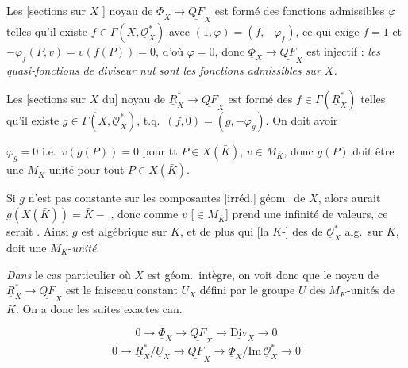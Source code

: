 \documentclass[11pt,a4paper]{article}
\begin{document}
Les [sections sur $X$ ] noyau de $\underline{\Phi}_X \to \underline{QF}_X$ est formé des fonctions admissibles $\varphi$ telles qu'il existe $f \in \Gamma(X, \underline{\mathcal{O}}^*_X)$ avec $(1, \varphi) = (f, -\varphi_f)$, ce qui exige $f = 1$ et $-\varphi_f(P, v) = v(f(P)) = 0$, d'où $\varphi = 0$, donc $\underline{\Phi}_X \to \underline{QF}_X$ est injectif :
\emph{les quasi-fonctions de diviseur nul sont les fonctions admissibles sur $X$.}

Les [sections sur $X$ du] noyau de $\underline{R}^*_X \to \underline{QF}_X$ est formé des $f \in \Gamma(\underline{R}^*_X)$ telles qu'il existe $g \in \Gamma(X, \underline{\mathcal{O}}^*_X)$, t.q.\ $(f, 0) = (g, -\varphi_g)$. On doit avoir

$\varphi_g = 0$ i.e.\ $v(g(P)) = 0$ pour tt $P \in X(\bar K)$, $v \in M_{\bar K}$, donc $g(P)$ doit être une $M_{\bar K}$-unité pour tout $P \in X(\bar K)$.

Si $g$ n'est pas constante sur les composantes [irréd.]  géom.\ de $X$, alors \ill{} aurait $g(X(\bar K)) = \bar K -$ , donc  comme $v$ [$\in M_{\bar K}$] prend une infinité de valeurs, ce \ill{} \ill{} \ill{} \ill{} serait  . Ainsi $g$ est algébrique sur $K$, et de plus \ill{} \ill{} qui  [la $K$-]  des  \struck{\ill{}} de $\underline{\mathcal{O}}^*_X$ alg.\ sur $K$, \ill{} doit  une $M_K$-\emph{unité}.

\emph{Dans} le cas particulier où $X$ est géom.\ intègre, on voit donc que le noyau de $\underline{R}^*_X \to \underline{QF}_X$ est le faisceau \struck{\ill{}} constant $U_X$ défini par le groupe $U$ des $M_K$-unités de $K$. On a donc les suites exactes can.

\[
  0 \to \underline{\Phi}_X \longrightarrow \underline{QF}_X \longrightarrow \underline{\mathrm{Div}}_X \longrightarrow 0
\]
\[
  0 \to \underline{R}^*_X / \underline{U}_X \longrightarrow \underline{QF}_X \longrightarrow \underline{\Phi}_X / \mathrm{Im}\, \underline{\mathcal{O}}^*_X \longrightarrow 0
\]
\end{document}
